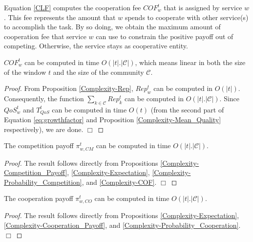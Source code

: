 Equation \ref{CLF} computes the cooperation fee $COF_w^t$ that is
assigned by service $w$. This fee represents the amount that $w$
spends to cooperate with other service(s) to accomplish the task.
By so doing, we obtain the maximum amount of cooperation fee that
service $w$ can use to constrain the positive payoff out of
competing. Otherwise, the service stays as cooperative entity.

\begin{proposition}\label{Complexity-COF}
$COF_w^t$ can be computed in time $O(|t|.|\mathcal{C}|)$, which
means linear in both the size of the window $t$ and the size of
the community $\mathcal{C}$.
\end{proposition}

\begin{proof}
From Proposition \ref{Complexity-Rep}, $Rep^t_w$ can be computed
in $O(|t|)$. Consequently, the function $\sum_{k\in
\mathcal{C}}Rep^t_k$ can be computed in $O(|t|.|\mathcal{C}|)$.
Since $QoS_w^t$ and $T_{QoS}^t$ can be computed in time $O(t)$
(from the second part of Equation \ref{eq:growthfactor} and
Proposition \ref{Complexity-Mean_Quality} respectively), we are
done. $\Box$
\end{proof}

\begin{lemma} \label{Complexity-Competition_Payoff-Final}
The competition payoff $\pi_{w,CM}^t$ can be computed in time
$O(|t|.|\mathcal{C}|)$.
\end{lemma}

\begin{proof}
The result follows directly from Propositions
\ref{Complexity-Competition_Payoff}, \ref{Complexity-Expectation},
\ref{Complexity-Probability_Competition}, and
\ref{Complexity-COF}. $\Box$
\end{proof}

\begin{lemma} \label{Complexity-Cooperation_Payoff-Final}
The cooperation payoff $\pi_{w,CO}^t$ can be computed in time
$O(|t|.|\mathcal{C}|)$.
\end{lemma}


\begin{proof}
The result follows directly from Propositions
\ref{Complexity-Expectation}, \ref{Complexity-Cooperation_Payoff},
and \ref{Complexity-Probability_Cooperation}. $\Box$
\end{proof}




%



